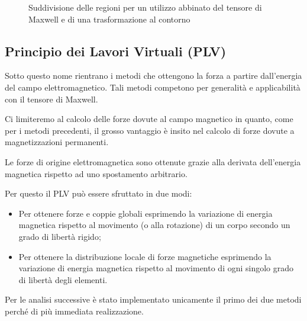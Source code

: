 \begin{figure}
\centering
\caption{Suddivisione delle regioni per un utilizzo abbinato del tensore di Maxwell e di una trasformazione al contorno}
\label{fig:5.2}
\end{figure}

\subsection{Principio dei Lavori Virtuali (PLV)}
Sotto questo nome rientrano i metodi che ottengono la forza a partire dall'energia del campo elettromagnetico. Tali metodi competono per generalità e applicabilità con il tensore di Maxwell.

Ci limiteremo al calcolo delle forze dovute al campo magnetico in quanto, come per i metodi precedenti, il grosso vantaggio è insito nel calcolo di forze dovute a magnetizzazioni permanenti.

Le forze di origine elettromagnetica sono ottenute grazie alla derivata dell'energia magnetica rispetto ad uno spostamento arbitrario.

Per questo il PLV può essere sfruttato in  due modi:
\begin{itemize}
\item Per ottenere forze e coppie globali esprimendo la variazione di energia magnetica rispetto al movimento (o alla rotazione) di un corpo secondo un grado di libertà rigido;
\item Per ottenere la distribuzione locale di forze magnetiche esprimendo la variazione di energia magnetica rispetto al movimento di ogni singolo grado di libertà degli elementi. 
\end{itemize}

Per le analisi successive è stato implementato unicamente il primo dei due metodi perché di più immediata realizzazione.

